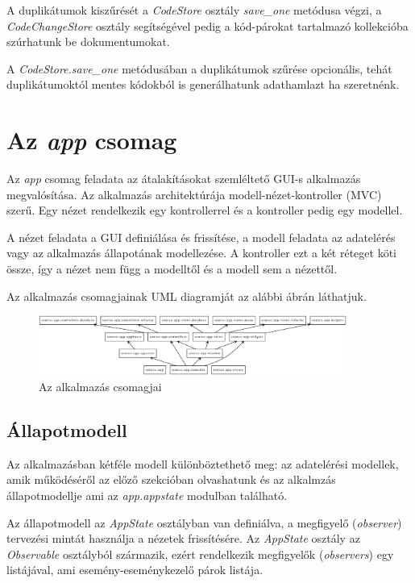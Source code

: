 A duplikátumok kiszűrését a \emph{CodeStore} osztály \emph{save\_one} metódusa végzi,
a \emph{CodeChangeStore} osztály segítségével pedig a kód-párokat tartalmazó kollekcióba
szúrhatunk be dokumentumokat.

A \emph{CodeStore.save\_one} metódusában a duplikátumok szűrése opcionális,
tehát duplikátumoktól mentes kódokból is generálhatunk adathamlazt ha szeretnénk.

\section{Az \emph{app} csomag}

Az \emph{app} csomag feladata az átalakításokat szemléltető GUI-s alkalmazás megvalósítása.
Az alkalmazás architektúrája modell-nézet-kontroller (MVC) szerű.
Egy nézet rendelkezik egy kontrollerrel és a kontroller pedig egy modellel.

A nézet feladata a GUI definiálása és frissítése,
a modell feladata az adatelérés vagy az alkalmazás állapotának modellezése.
A kontroller ezt a két réteget köti össze,
így a nézet nem függ a modelltől és a modell sem a nézettől.

Az alkalmazás csomagjainak UML diagramját az alábbi ábrán láthatjuk.

\begin{figure}[H]
	\centering
	\includegraphics[width=0.9\textwidth]{images/uml/apppackages.eps}
	\caption{Az alkalmazás csomagjai}
\end{figure}

\subsection{Állapotmodell}
\label{subsec:appstate}

Az alkalmazásban kétféle modell különböztethető meg:
az adatelérési modellek, amik működéséről az előző szekcióban olvashatunk
és az alkalmzás állapotmodellje ami az \emph{app.appstate} modulban található.

Az állapotmodell az \emph{AppState} osztályban van definiálva,
a megfigyelő (\emph{observer}) tervezési mintát használja a nézetek frissítésére.
Az \emph{AppState} osztály az \emph{Observable} osztályból származik,
ezért rendelkezik megfigyelők (\emph{observers}) egy listájával,
ami esemény-eseménykezelő párok listája.

